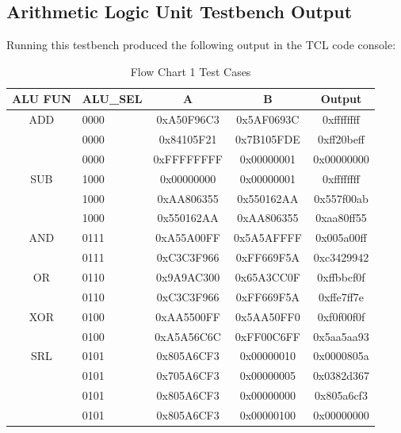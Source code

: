 \documentclass[
    a4paper, %
	12pt, %
    ]{CSSullivanBusinessReport}
\begin{document}
\begin{fullwidth}



\newpage
\subsection{Arithmetic Logic Unit Testbench Output} %
Running this testbench produced the following output in the TCL code console:
\begin{table}[H]
    \centering
    \footnotesize
    \captionsetup{style=widetable}
    \caption{Flow Chart 1 Test Cases}
    \begin{tabular}{|c||l|c|c|c|}
    \hline
     ALU FUN &ALU\_SEL&A& B& Output\\\hline
    \hline
    ADD&0000&0xA50F96C3& 0x5AF0693C& 0xffffffff\\\hline
    &0000&0x84105F21& 0x7B105FDE& 0xff20beff\\\hline
    &0000&0xFFFFFFFF& 0x00000001& 0x00000000\\\hline
    \hline
    SUB&1000& 0x00000000& 0x00000001&0xffffffff\\\hline
    &1000& 0xAA806355& 0x550162AA& 0x557f00ab\\\hline
    &1000& 0x550162AA& 0xAA806355&0xaa80ff55\\\hline
    \hline
    AND&0111& 0xA55A00FF& 0x5A5AFFFF&0x005a00ff\\\hline
    &0111& 0xC3C3F966& 0xFF669F5A&0xc3429942\\\hline
    \hline
    OR&0110& 0x9A9AC300& 0x65A3CC0F&0xffbbcf0f\\\hline
    &0110& 0xC3C3F966& 0xFF669F5A&0xffe7ff7e\\\hline
    \hline
    XOR&0100& 0xAA5500FF& 0x5AA50FF0&0xf0f00f0f\\\hline
    &0100& 0xA5A56C6C& 0xFF00C6FF&0x5aa5aa93\\\hline
    \hline
    SRL&0101& 0x805A6CF3& 0x00000010&0x0000805a\\\hline
    &0101& 0x705A6CF3& 0x00000005&0x0382d367\\\hline
    &0101& 0x805A6CF3& 0x00000000&0x805a6cf3\\\hline
    &0101& 0x805A6CF3& 0x00000100&0x00000000\\\hline

\end{tabular}
\end{table}
\end{fullwidth}
\end{document}
